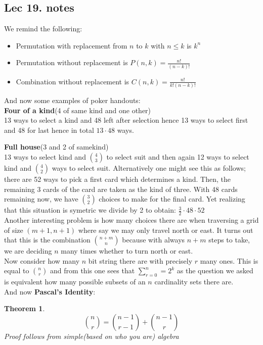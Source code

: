 \documentclass[titlepage]{article}
\theoremstyle{definition}
\newtheorem{theorem}{Theorem}[section]
\numberwithin{equation}{subsection}
\numberwithin{remark}{subsection}
\begin{document}
\subsection{Lec 19. notes}
We remind the following:
\begin{itemize}
    \item Permutation with replacement from $n$ to $k$ with $n\leq k$ is $k^{n}$
    \item Permutation without replacement is $P(n,k) = \frac{n!}{(n-k)!}$
    \item Combination without replacement is $C(n,k) = \frac{n!}{k!(n-k)!}$
\end{itemize}

And now some examples of poker handouts:
\\

\textbf{Four of a kind}(4 of same kind and one other)
\\
13 ways to select a kind and 48 left after selection hence 13 ways to select first and 48 for last hence in total $13\cdot 48$ ways. 


\textbf{Full house}(3 and 2 of samekind)
\\
13 ways to select kind and $\binom{4}{3}$ to select suit and then again 12 ways to select kind and $\binom{4}{2}$ ways to select suit. Alternatively one might see this as follows; there are 52 ways to pick a first card which determines a kind. Then, the remaining 3 cards of the card are taken as the kind of three. With 48 cards remaining now, we have $\binom{3}{2}$ choices to make for the final card. Yet realizing that this situation is symetric we divide by 2 to obtain: $\frac{3}{2}\cdot48\cdot52$
\\

Another interesting problem is how many choices there are when traversing a grid of size $(m+1, n+1)$ where say we may only travel north or east. It turns out that this is the combination $\binom{n+m}{n}$ because with always $n+m$ steps to take, we are deciding $n$ many times whether to turn north or east.
\\

Now consider how many $n$ bit string there are with precisely $r$ many ones. This is equal to $\binom{n}{r}$ and from this one sees that $\sum_{r=0}^{n} = 2^k$ as the question we asked is equivalent how many possible subsets of an $n$ cardinality sets there are. 
\\

And now \textbf{Pascal's Identity}:
\begin{theorem}
$$ \binom{n}{r} = \binom{n-1}{r-1} + \binom{n-1}{r}$$
\textit{Proof follows from simple(based on who you are) algebra}
\end{theorem}
\end{document}

